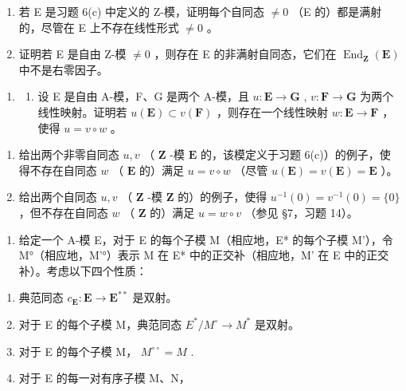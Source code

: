 \begin{enumerate}
\def\labelenumi{(\alph{enumi})}
\setcounter{enumi}{1}
\item
  若 E 是习题 6(c) 中定义的 Z-模，证明每个自同态 \(\neq 0\) （E 的）都是满射的，尽管在 E 上不存在线性形式 \(\neq 0\) 。
\item
  证明若 E 是自由 Z-模 \(\neq0\) ，则存在 E 的非满射自同态，它们在 \(\operatorname{End}_{\mathbf{Z}}(\mathbf{E})\) 中不是右零因子。
\end{enumerate}

\begin{enumerate}
\def\labelenumi{\arabic{enumi}.}
\setcounter{enumi}{7}
\tightlist
\item
  \begin{enumerate}
  \def\labelenumii{(\alph{enumii})}
  \tightlist
  \item
    设 E 是自由 A-模，F、G 是两个 A-模，且 \(u: \mathbf{E} \to \mathbf{G}\) , \(v: \mathbf{F} \to \mathbf{G}\) 为两个线性映射。证明若 \(u(\mathbf{E}) \subset v(\mathbf{F})\) ，则存在一个线性映射 \(w: \mathbf{E} \to \mathbf{F}\) ，使得 \(u = v \circ w\) 。
  \end{enumerate}
\end{enumerate}

\begin{enumerate}
\def\labelenumi{(\alph{enumi})}
\setcounter{enumi}{1}
\item
  给出两个非零自同态 \(u, v\) （ \(\mathbf{Z}\) -模 \(\mathbf{E}\) 的，该模定义于习题 6(c)）的例子，使得不存在自同态 \(w\) （ \(\mathbf{E}\) 的）满足 \(u = v \circ w\) （尽管 \(u(\mathbf{E}) = v(\mathbf{E}) = \mathbf{E}\) ）。
\item
  给出两个自同态 \(u, v\) （ \(\mathbf{Z}\) -模 \(\mathbf{Z}\) 的）的例子，使得 \(u^{-1}(0) = v^{-1}(0) = \{0\}\) ，但不存在自同态 \(w\) （ \(\mathbf{Z}\) 的）满足 \(u = w \circ v\) （参见 §7，习题 14）。
\end{enumerate}

\begin{enumerate}
\def\labelenumi{\arabic{enumi}.}
\setcounter{enumi}{8}
\tightlist
\item
  给定一个 A-模 E，对于 E 的每个子模 M（相应地，E* 的每个子模 M'），令 M°（相应地，M'°）表示 M 在 E* 中的正交补（相应地，M' 在 E 中的正交补）。考虑以下四个性质：
\end{enumerate}

\begin{enumerate}
\def\labelenumi{(\Alph{enumi})}
\item
  典范同态 \(c_{\mathbf{E}}: \mathbf{E} \to \mathbf{E}^{**}\) 是双射。
\item
  对于 E 的每个子模 M，典范同态 \(E^{*}/M^{\circ} \rightarrow M^{*}\) 是双射。
\item
  对于 E 的每个子模 M， \(M^{\circ\circ} = M\) .
\item
  对于 E 的每一对有序子模 M、N，
\end{enumerate}

